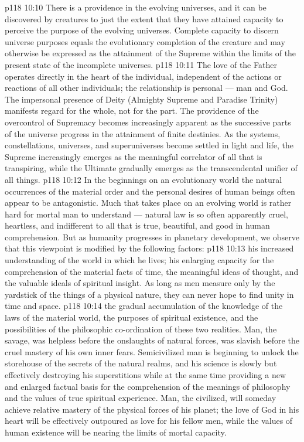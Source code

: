 \vs p118 10:10 There is a providence in the evolving universes, and it can be discovered by creatures to just the extent that they have attained capacity to perceive the purpose of the evolving universes. Complete capacity to discern universe purposes equals the evolutionary completion of the creature and may otherwise be expressed as the attainment of the Supreme within the limits of the present state of the incomplete universes.
\vs p118 10:11 The love of the Father operates directly in the heart of the individual, independent of the actions or reactions of all other individuals; the relationship is personal --- man and God. The impersonal presence of Deity (Almighty Supreme and Paradise Trinity) manifests regard for the whole, not for the part. The providence of the overcontrol of Supremacy becomes increasingly apparent as the successive parts of the universe progress in the attainment of finite destinies. As the systems, constellations, universes, and superuniverses become settled in light and life, the Supreme increasingly emerges as the meaningful correlator of all that is transpiring, while the Ultimate gradually emerges as the transcendental unifier of all things.
\vs p118 10:12 \pc In the beginnings on an evolutionary world the natural occurrences of the material order and the personal desires of human beings often appear to be antagonistic. Much that takes place on an evolving world is rather hard for mortal man to understand --- natural law is so often apparently cruel, heartless, and indifferent to all that is true, beautiful, and good in human comprehension. But as humanity progresses in planetary development, we observe that this viewpoint is modified by the following factors:
\vs p118 10:13 \bibnobreakspace {} his increased understanding of the world in which he lives; his enlarging capacity for the comprehension of the material facts of time, the meaningful ideas of thought, and the valuable ideals of spiritual insight. As long as men measure only by the yardstick of the things of a physical nature, they can never hope to find unity in time and space.
\vs p118 10:14 \bibnobreakspace {} the gradual accumulation of the knowledge of the laws of the material world, the purposes of spiritual existence, and the possibilities of the philosophic co\hyp{}ordination of these two realities. Man, the savage, was helpless before the onslaughts of natural forces, was slavish before the cruel mastery of his own inner fears. Semicivilized man is beginning to unlock the storehouse of the secrets of the natural realms, and his science is slowly but effectively destroying his superstitions while at the same time providing a new and enlarged factual basis for the comprehension of the meanings of philosophy and the values of true spiritual experience. Man, the civilized, will someday achieve relative mastery of the physical forces of his planet; the love of God in his heart will be effectively outpoured as love for his fellow men, while the values of human existence will be nearing the limits of mortal capacity.
